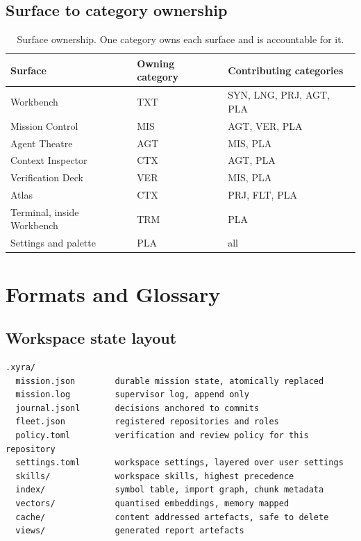 \section{Surface to category ownership}

\begin{table}[h]
\centering
\small
\begin{tabularx}{\textwidth}{l l X}
\toprule
\textbf{Surface} & \textbf{Owning category} & \textbf{Contributing categories} \\
\midrule
Workbench & TXT & SYN, LNG, PRJ, AGT, PLA \\
Mission Control & MIS & AGT, VER, PLA \\
Agent Theatre & AGT & MIS, PLA \\
Context Inspector & CTX & AGT, PLA \\
Verification Deck & VER & MIS, PLA \\
Atlas & CTX & PRJ, FLT, PLA \\
Terminal, inside Workbench & TRM & PLA \\
Settings and palette & PLA & all \\
\bottomrule
\end{tabularx}
\caption{Surface ownership. One category owns each surface and is accountable for it.}
\end{table}

\chapter{Formats and Glossary}

\section{Workspace state layout}

\begin{lstlisting}
.xyra/
  mission.json        durable mission state, atomically replaced
  mission.log         supervisor log, append only
  journal.jsonl       decisions anchored to commits
  fleet.json          registered repositories and roles
  policy.toml         verification and review policy for this repository
  settings.toml       workspace settings, layered over user settings
  skills/             workspace skills, highest precedence
  index/              symbol table, import graph, chunk metadata
  vectors/            quantised embeddings, memory mapped
  cache/              content addressed artefacts, safe to delete
  views/              generated report artefacts
\end{lstlisting}

